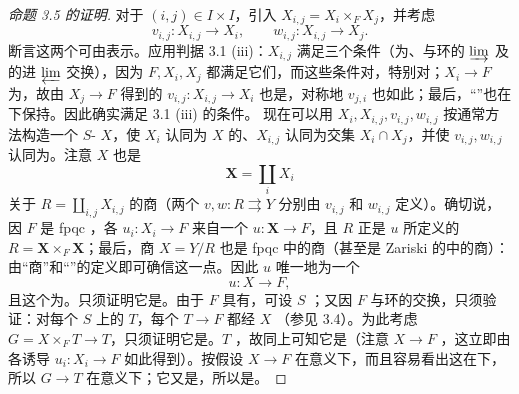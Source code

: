 \begin{proof}[命题 3.5 的证明]
对于 $(i,j)\in I\times I$，引入 $X_{i,j}=X_i\times_F X_j$，并考虑
\[v_{i,j}:X_{i,j}\longrightarrow X_i,\qquad w_{i,j}:X_{i,j}\longrightarrow X_j.\]
断言这两个可由表示。应用判据 3.1 (iii)：$X_{i,j}$ 满足三个条件（为、与环的 $\varinjlim$ 及的进 $\varprojlim$ 交换），因为 $F,X_i,X_j$ 都满足它们，而这些条件对，特别对；$X_i\to F$ 为，故由 $X_j\to F$ 得到的 $v_{i,j}:X_{i,j}\to X_i$ 也是，对称地 $v_{j,i}$ 也如此；最后，“”也在下保持。因此确实满足 3.1 (iii) 的条件。
现在可以用 $X_i,X_{i,j},v_{i,j},w_{i,j}$ 按通常方法构造一个 $S$- $X$，使 $X_i$ 认同为 $X$ 的、$X_{i,j}$ 认同为交集 $X_i\cap X_j$，并使 $v_{i,j},w_{i,j}$ 认同为。注意 $X$ 也是
\[\mathbf X=\coprod_i X_i\]
关于 $R=\coprod_{i,j}X_{i,j}$ 的商（两个 $v,w:R\rightrightarrows Y$ 分别由 $v_{i,j}$ 和 $w_{i,j}$ 定义）。确切说，因 $F$ 是 fpqc ，各 $u_i:X_i\to F$ 来自一个 $u:\mathbf X\to F$，且 $R$ 正是 $u$ 所定义的 $R=\mathbf X\times_F\mathbf X$；最后，商 $X=Y/R$ 也是 fpqc 中的商（甚至是 Zariski 的中的商）：由“商”和“”的定义即可确信这一点。因此 $u$ 唯一地为一个
\[u:X\longrightarrow F,\]
且这个为。只须证明它是。由于 $F$ 具有，可设 $S$ ；又因 $F$ 与环的交换，只须验证：对每个 $S$ 上的 $T$，每个 $T\to F$ 都经 $X$ （参见 3.4）。为此考虑 $G=X\times_F T\to T$，只须证明它是。$T$ ，故同上可知它是（注意 $X\to F$ ，这立即由各诱导 $u_i:X_i\to F$ 如此得到）。按假设 $X\to F$ 在意义下，而且容易看出这在下，所以 $G\to T$ 在意义下；它又是，所以是。
\end{proof}
